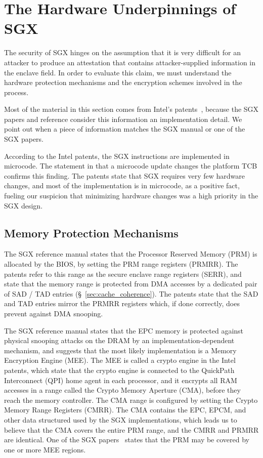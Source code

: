 \section{The Hardware Underpinnings of SGX}

The security of SGX hinges on the assumption that it is very difficult for an
attacker to produce an attestation that contains attacker-supplied information
in the enclave field. In order to evaluate this claim, we must understand the
hardware protection mechanisms and the encryption schemes involved in the
process.

Most of the material in this section comes from Intel's
patents~\cite{intel2013patent1, intel2013patent2}, because the SGX papers and
reference consider this information an implementation detail. We point out when
a piece of information matches the SGX manual or one of the SGX papers.

According to the Intel patents, the SGX instructions are implemented in
microcode. The statement in \cite{anati2013sgx} that a microcode update changes
the platform TCB confirms this finding. The patents state that SGX requires
very few hardware changes, and most of the implementation is in microcode, as a
positive fact, fueling our suspicion that minimizing hardware changes was a
high priority in the SGX design.


\subsection{Memory Protection Mechanisms}

The SGX reference manual states that the Processor Reserved Memory (PRM) is
allocated by the BIOS, by setting the PRM range registers (PRMRR). The patents
refer to this range as the secure enclave range registers (SERR), and state
that the memory range is protected from DMA accesses by a dedicated pair of
SAD / TAD entries (\S~\ref{sec:cache_coherence}).
The patents state that the SAD and TAD entries mirror the PRMRR registers
which, if done correctly, does prevent against DMA snooping.

The SGX reference manual states that the EPC memory is protected against
physical snooping attacks on the DRAM by an implementation-dependent mechanism,
and suggests that the most likely implementation is a Memory Encryption Engine
(MEE). The MEE is called a crypto engine in the Intel patents, which state that
the crypto engine is connected to the QuickPath Interconnect (QPI) home agent
in each processor, and it encrypts all RAM accesses in a range called the
Crypto Memory Aperture (CMA), before they reach the memory controller. The CMA
range is configured by setting the Crypto Memory Range Registers (CMRR). The
CMA contains the EPC, EPCM, and other data structured used by the SGX
implementations, which leads us to believe that the CMA covers the entire PRM
range, and the CMRR and PRMRR are identical. One of the SGX
papers~\cite{mckeen2013sgx} states that the PRM may be covered by one or more
MEE regions.

